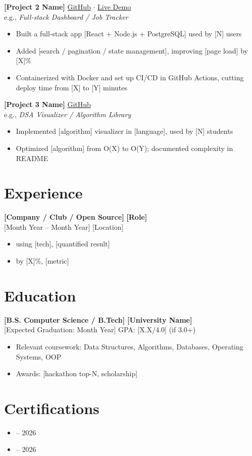 \documentclass[11pt, letterpaper]{article}
\begin{document}
\textbf{[Project 2 Name]} \hfill \small{\href{https://github.com/yourname/p2}{GitHub} $\cdot$ \href{https://p2.vercel.app}{Live Demo}} \normalsize\\
e.g., \textit{Full-stack Dashboard / Job Tracker}
\begin{itemize}
  \item Built a full-stack app [React + Node.js + PostgreSQL] used by [N] users
  \item Added [search / pagination / state management], improving [page load] by [X]\%
  \item Containerized with Docker and set up CI/CD in GitHub Actions, cutting deploy time from [X] to [Y] minutes
\end{itemize}

\textbf{[Project 3 Name]} \hfill \small{\href{https://github.com/yourname/p3}{GitHub}} \normalsize\\
e.g., \textit{DSA Visualizer / Algorithm Library}
\begin{itemize}
  \item Implemented [algorithm] visualizer in [language], used by [N] students
  \item Optimized [algorithm] from O(X) to O(Y); documented complexity in README
\end{itemize}

\section{Experience}

\textbf{[Company / Club / Open Source]} \hfill \textbf{[Role]}\\
{[Month Year -- Month Year]} \hfill {[Location]}
\begin{itemize}
  \item [What you shipped / owned] using [tech], [quantified result]
  \item [Led / Automated / Reduced] [thing] by [X]\%, [metric]
\end{itemize}

\section{Education}
\textbf{[B.S. Computer Science / B.Tech]} \hfill \textbf{[University Name]}\\
{[Expected Graduation: Month Year]} \hfill GPA: {[X.X/4.0]} (if 3.0+)
\begin{itemize}
  \item Relevant coursework: Data Structures, Algorithms, Databases, Operating Systems, OOP
  \item Awards: [hackathon top-N, scholarship]
\end{itemize}

\section{Certifications}
\begin{itemize}
  \item [AWS Certified Cloud Practitioner] -- 2026
  \item [Other certification] -- 2026
\end{itemize}
\end{document}
